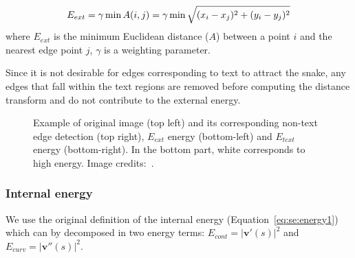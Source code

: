 \begin{equation}\label{eq:se:energy3}
  E_{ext} = \gamma \min A(i,j) = \gamma \min  \sqrt{(x_i-x_j)^2+(y_i-y_j)^2}\\
\end{equation}
where $E_{ext}$ is the minimum Euclidean distance ($A$) between a point $i$ and the nearest edge point $j$, $\gamma$ is a weighting parameter.

Since it is not desirable for edges corresponding to text to attract the snake, any edges that fall within the text regions are removed before computing the distance transform and do not contribute to the external energy.
	
	\begin{figure}[!ht]	%
	  \centering
		\caption[Active contour energies for open balloon extraction]{Example of original image (top left) and its corresponding non-text edge detection (top right), $E_{ext}$ energy (bottom-left) and $E_{text}$ energy (bottom-right). In the bottom part, white corresponds to high energy. Image credits:~\cite{Bubble09}. }
		\label{fig:se:distance_transform}
	\end{figure}

\subsubsection{Internal energy}
We use the original definition of the internal energy (Equation~\ref{eq:se:energy1}) which can by decomposed in two energy terms: $E_{cont} = \left|\mathbf{v}'(s) \right|^2$ and $E_{curv}=\left| \mathbf{v}''(s) \right|^2$.
% 


